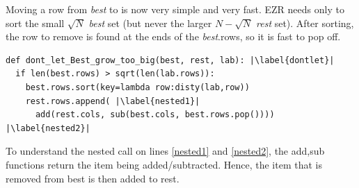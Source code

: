\documentclass[AMA,STIX2COL]{WileyNJDv5}
\begin{document}
Moving a row from {\em best} to {\rest} is now very simple and very fast.
EZR needs only to sort the small $\sqrt{N}$ {\em best} set
(but never the larger $N- \sqrt{N}$  {\em rest} set).
After sorting, the row to remove is found at the ends of the {\em best}.\textsf{rows}, so it is fast
to pop off.
\begin{verbatim}
def dont_let_Best_grow_too_big(best, rest, lab): |\label{dontlet}|
  if len(best.rows) > sqrt(len(lab.rows)):
    best.rows.sort(key=lambda row:disty(lab,row))
    rest.rows.append( |\label{nested1}|
      add(rest.cols, sub(best.cols, best.rows.pop()))) |\label{nested2}|
\end{verbatim}
To understand the nested call on lines \ref{nested1} and \ref{nested2},  the \textsf{add,sub} functions return the item being added/subtracted. Hence, the item that is removed from \textsf{best} is then added to \textsf{rest}.
 
\end{document}
